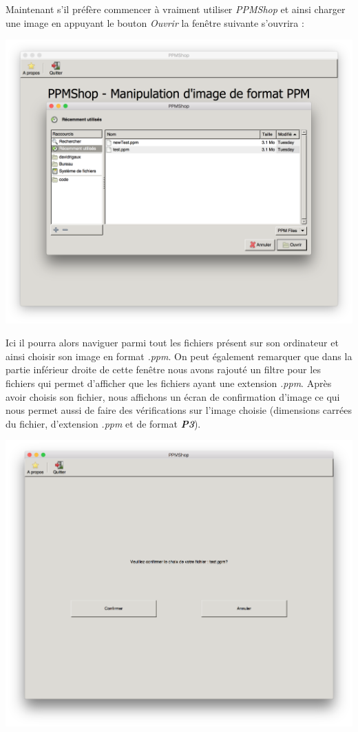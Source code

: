 \documentclass[12pt]{article}
\begin{document}
Maintenant s'il préfère commencer à vraiment utiliser \textit{PPMShop} et ainsi charger une image en appuyant le bouton \textit{Ouvrir} la fenêtre suivante s'ouvrira : 

\begin{center}
\includegraphics[scale = 0.4]{loadScreen}\\
\end{center}

Ici il pourra alors naviguer parmi tout les fichiers présent sur son ordinateur et ainsi choisir son image en format \textit{.ppm}. On peut également remarquer que dans la partie inférieur droite de cette fenêtre nous avons rajouté un filtre pour les fichiers qui permet d'afficher que les fichiers ayant une extension \textit{.ppm}.
Après avoir choisis son fichier, nous affichons un écran de confirmation d'image ce qui nous permet aussi de faire des vérifications sur l'image choisie (dimensions carrées du fichier, d'extension \textit{.ppm} et de format \textit{\textbf{P3}}).

\begin{center}
\includegraphics[scale = 0.4]{confirmationScreen}\\
\end{center}
\end{document}
